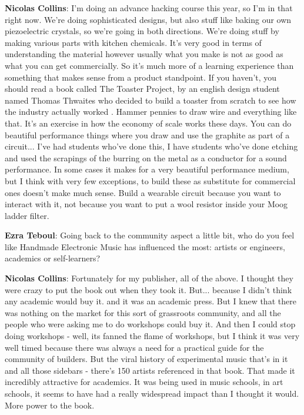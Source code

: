 \textbf{Nicolas Collins}: I’m doing an advance hacking course this year, so I’m in that right now. We’re doing sophisticated designs, but also stuff like baking our own piezoelectric crystals, so we’re going in both directions. We’re doing stuff by making various parts with kitchen chemicals. It’s very good in terms of understanding the material however usually what you make is not as good as what you can get commercially. So it’s much more of a learning experience than something that makes sense from a product standpoint. If you haven’t, you should read a book called The Toaster Project, by an english design student named Thomas Thwaites who decided to build a toaster from scratch to see how the industry actually worked \citep{thwaites2011}. Hammer pennies to draw wire and everything like that. It’s an exercise in how the economy of scale works these days. You can do beautiful performance things where you draw and use the graphite as part of a circuit... I’ve had students who’ve done this, I have students who’ve done etching and used the scrapings of the burring on the metal as a conductor for a sound performance. In some cases it makes for a very beautiful performance medium, but I think with very few exceptions, to build these as substitute for commercial ones doesn’t make much sense. Build a wearable circuit because you want to interact with it, not because you want to put a wool resistor inside your Moog ladder filter.
					
\textbf{Ezra Teboul}: Going back to the community aspect a little bit, who do you feel like Handmade Electronic Music has influenced the most: artists or engineers, academics or self-learners?
					
\textbf{Nicolas Collins}: Fortunately for my publisher, all of the above. I thought they were crazy to put the book out when they took it. But... because I didn’t think any academic would buy it. and it was an academic press. But I knew that there was nothing on the market for this sort of grassroots community, and all the people who were asking me to do workshops could buy it. And then I could stop doing workshops - well, its fanned the flame of workshops, but I think it was very well timed because there was always a need for a practical guide for the community of builders. But the viral history of experimental music that’s in it and all those sidebars - there’s 150 artists referenced in that book. That made it incredibly attractive for academics. It was being used in music schools, in art schools, it seems to have had a really widespread impact than I thought it would. More power to the book.
					
